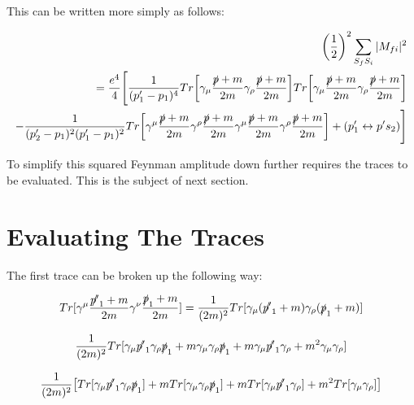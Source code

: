 \documentclass[a4]{article}
\begin{document}
    This can be written more simply as follows:

    \begin{framed}
        \begin{equation}
            \begin{aligned}
                \bigg( \frac{1}{2} \bigg)^2 \sum_{S_f S_i} |M_{f i}|^2 \\
                = \frac{e^4}{4} \Bigg[ \frac{1}{(p'_1 - p_1)^4} Tr \bigg[ \gamma_{\mu} \frac{\slashed{p} + m}{2m} \gamma_{\rho} \frac{\slashed{p} + m}{2m} \bigg] Tr \bigg[ \gamma_{\mu} \frac{\slashed{p} + m}{2m} \gamma_{\rho} \frac{\slashed{p} + m}{2m} \bigg] \\
                - \frac{1}{(p'_2 - p_1)^2 (p'_1 - p_1)^2 } Tr \bigg[ \gamma^{\mu} \frac{\slashed{p} + m}{2m} \gamma^{\rho} \frac{\slashed{p} + m}{2m} \gamma^{\mu} \frac{\slashed{p} + m}{2m} \gamma^{\rho} \frac{\slashed{p} + m}{2m} \bigg] + (p'_1 \leftrightarrow p's_2) \Bigg]
            \end{aligned}
        \end{equation}
    \end{framed}

    To simplify this squared Feynman amplitude down further requires the traces to be evaluated. This is the subject of next section.

    \section*{Evaluating The Traces}

    The first trace can be broken up the following way:

    \begin{equation}
        Tr [\gamma^\mu \frac{\slashed{p'}_1 + m}{2m} \gamma^\nu \frac{\slashed{p}_1 + m}{2 m}] = \frac{1}{(2m)^2} Tr[\gamma_\mu (\slashed{p'}_1 + m) \gamma_\rho (\slashed{p}_1 + m)]
    \end{equation}

    \begin{equation}
        \frac{1}{(2m)^2} Tr[\gamma_\mu \slashed{p'}_1 \gamma_\rho \slashed{p}_1 + m \gamma_\mu \gamma_\rho \slashed{p}_1 + m \gamma_\mu \slashed{p'}_1 \gamma_\rho + m^2 \gamma_\mu \gamma_\rho]
    \end{equation}

    \begin{equation}
        \frac{1}{(2m)^2} \big[ Tr[\gamma_\mu \slashed{p'}_1 \gamma_\rho \slashed{p}_1] + m Tr[\gamma_\mu \gamma_\rho \slashed{p}_1] + m Tr[\gamma_\mu \slashed{p'}_1 \gamma_\rho] + m^2 Tr[\gamma_\mu \gamma_\rho] \big]
    \end{equation}
\end{document}
